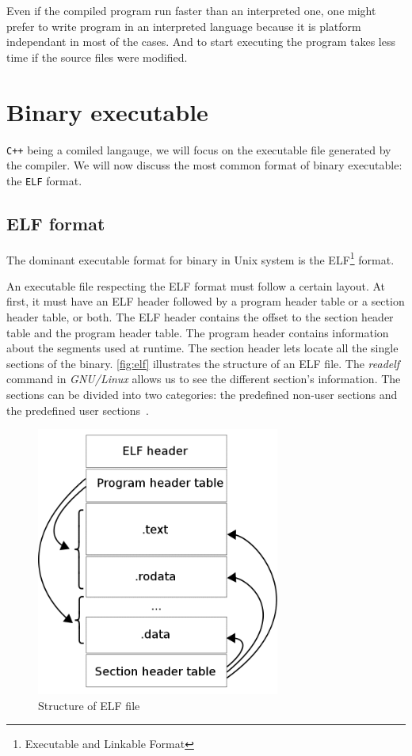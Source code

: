 \documentclass[a4paper,11pt,oneside]{report}
\begin{document}
Even if the compiled program run faster than an interpreted one, one might
prefer to write program in an interpreted language because it is platform
independant in most of the cases. And to start executing the program takes less
time if the source files were modified.



\section{Binary executable}
\texttt{C++} being a comiled langauge, we will focus on the executable file
generated by the compiler. We will now discuss the most common format of binary
executable: the \texttt{ELF} format.
\subsection{ELF format}
%
The dominant executable format for binary in Unix system is the
ELF\footnote{Executable and Linkable Format} format. 


An executable file respecting the ELF format must follow a certain layout. At
first, it must have an ELF header followed by a program header table or a section
header table, or both. 
The ELF header contains the offset to the section header table and the program
header table. The program header contains information about the segments used
at runtime. The section header lets locate all the single sections of the
binary. \autoref{fig:elf} illustrates the structure of an ELF file. The
\textit{readelf}~\cite{readelfMan} command in \textit{GNU/Linux} allows us to
see the different section's information. The sections can be divided into two
categories: the predefined non-user sections and the predefined user
sections~\cite{sparc}.

\begin{figure}[H]
    \centering
    \includegraphics[width=8cm]{elf_structure.png} 
    \caption{Structure of ELF file}
    \label{fig:elf}
\end{figure}
\end{document}
